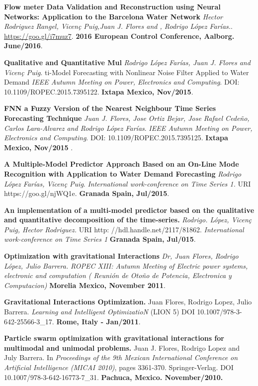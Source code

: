 \documentclass[10pt]{article}
\newenvironment{innerlist}[1][\enskip\textbullet]%
        {\begin{compactitem}[#1]}{\end{compactitem}}
\newcommand{\blankline}{\quad\pagebreak[2]}
\begin{document}
\begin{innerlist}
\item \textbf{Flow meter Data Validation and Reconstruction using Neural Networks: Application to the Barcelona Water Network} \textit{Hector Rodriguez Rangel, Vicen\c{c} Puig,Juan J. Flores and ,  Rodrigo López Farías.}. \url{https://goo.gl/i7muz7}. \textbf{2016 European Control Conference, Aalborg. June/2016}.

\item \textbf{Qualitative and Quantitative Mul} \textit{Rodrigo López Farías, Juan J. Flores and Vicen\c{c} Puig}.  ti-Model Forecasting with Nonlinear Noise Filter Applied to Water Demand \textit{IEEE Autumn Meeting on Power, Electronics and Computing}. DOI: 10.1109/ROPEC.2015.7395122.  \textbf{Ixtapa Mexico, Nov/2015}.

\item \textbf{FNN a Fuzzy Version of the Nearest Neighbour Time Series Forecasting Technique } \textit{Juan J. Flores, Jose Ortiz Bejar, Jose Rafael Cedeño, Carlos Lara-Alvarez and Rodrigo López Farías}. \textit{IEEE Autumn Meeting on Power, Electronics and Computing}. DOI: 10.1109/ROPEC.2015.7395125. \textbf{Ixtapa Mexico, Nov/2015 }.

\item \textbf{A Multiple-Model Predictor Approach Based on an On-Line Mode Recognition with Application to Water Demand Forecasting} \textit{Rodrigo López Farías, Vicen\c{c} Puig}.  \textit{International work-conference on Time Series 1. 
} URI https://goo.gl/njWQ1e. \textbf{Granada Spain, Jul/2015}.

\item \textbf{An implementation of a multi-model predictor based on the qualitative and quantitative decomposition of the time-series.} \textit{Rodrigo. López, Vicen\c{c} Puig, Hector Rodriguez.} URI http: //hdl.handle.net/2117/81862. \textit{International work-conference on Time Series 1 
} \textbf{Granada Spain, Jul/015}.

\item \textbf{Optimization with gravitational Interactions} \textit{Dr, Juan Flores, Rodrigo López, Julio Barrera.}   \textit{ROPEC XIII: Autumn Meeting of Electric power systems, electronic and computation ( Reunión de Oto\~no de Potencia, Electronica y Computacion)} \textbf{ Morelia Mexico, November 2011}.

\item \textbf{Gravitational Interactions Optimization.} Juan Flores, Rodrigo Lopez, Julio Barrera.  \textit{Learning and Intelligent OptimizatioN}  (LION 5) DOI 10.1007/978-3-642-25566-3\_17. \textbf{Rome, Italy - Jan/2011}. 

\item \textbf{Particle swarm optimization with gravitational interactions for multimodal and unimodal problems.} Juan J. Flores, Rodrigo Lopez and July Barrera.  In \textit{Proceedings of the 9th Mexican International Conference on Artificial Intelligence (MICAI 2010)}, pages 3361-370. Springer-Verlag. DOI 10.1007/978-3-642-16773-7\_31. \textbf{Pachuca, Mexico. November/2010.}

\end{innerlist}

\blankline
\end{document}
